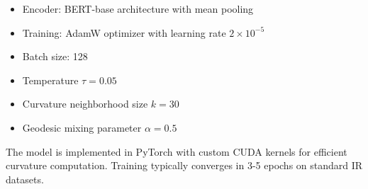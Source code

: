 \begin{itemize}
    \item Encoder: BERT-base architecture with mean pooling
    \item Training: AdamW optimizer with learning rate $2\times10^{-5}$
    \item Batch size: 128
    \item Temperature $\tau = 0.05$
    \item Curvature neighborhood size $k = 30$
    \item Geodesic mixing parameter $\alpha = 0.5$
\end{itemize}

The model is implemented in PyTorch with custom CUDA kernels for efficient curvature computation. Training typically converges in 3-5 epochs on standard IR datasets.

